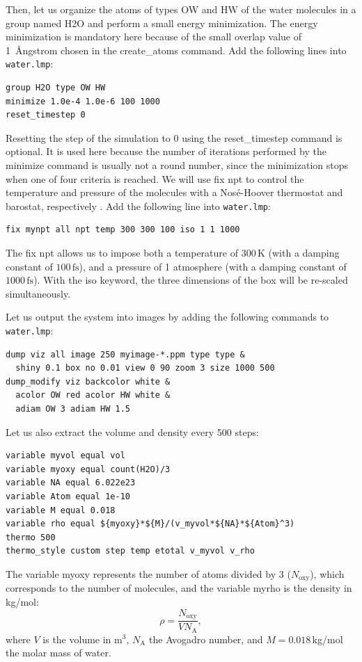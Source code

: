 \documentclass[9pt,tutorial]{livecoms}
\newcommand{\lmpcmd}[1]{\hspace{0pt}\colorbox{listing}{\textcolor{command}{\small{#1}}}\hspace{0pt}} %
\newcommand{\flecmd}[1]{\textcolor{command}{\texttt{#1}}} %
\begin{document}
Then, let us organize the atoms of types OW and HW of the water molecules in a
group named \lmpcmd{H2O} and perform a small energy minimization.  The energy
minimization is mandatory here because of the small \lmpcmd{overlap} value
of 1~Ångstrom chosen in the \lmpcmd{create\_atoms} command.  Add the following lines into \flecmd{water.lmp}:
\begin{lstlisting}
group H2O type OW HW
minimize 1.0e-4 1.0e-6 100 1000
reset_timestep 0
\end{lstlisting}
Resetting the step of the simulation to 0 using the
\lmpcmd{reset\_timestep} command is optional.
It is used here because the number of iterations performed by the \lmpcmd{minimize}
command is usually not a round number, since the minimization stops when one of
four criteria is reached.  We will use \lmpcmd{fix npt} to control the temperature
and pressure of the molecules with a Nosé-Hoover thermostat and barostat,
respectively \cite{nose1984unified, hoover1985canonical, martyna1994constant}.
Add the following line into \flecmd{water.lmp}:
\begin{lstlisting}
fix mynpt all npt temp 300 300 100 iso 1 1 1000
\end{lstlisting}
The \lmpcmd{fix npt} allows us to impose both a temperature of $300\,\text{K}$
(with a damping constant of $100\,\text{fs}$), and a pressure of 1 atmosphere
(with a damping constant of $1000\,\text{fs}$).  With the \lmpcmd{iso} keyword,
the three dimensions of the box will be re-scaled simultaneously.

Let us output the system into images by adding the following commands to \flecmd{water.lmp}:
\begin{lstlisting}
dump viz all image 250 myimage-*.ppm type type &
  shiny 0.1 box no 0.01 view 0 90 zoom 3 size 1000 500
dump_modify viz backcolor white &
  acolor OW red acolor HW white &
  adiam OW 3 adiam HW 1.5
\end{lstlisting}
Let us also extract the volume and density every 500 steps:
\begin{lstlisting}
variable myvol equal vol
variable myoxy equal count(H2O)/3
variable NA equal 6.022e23
variable Atom equal 1e-10
variable M equal 0.018
variable rho equal ${myoxy}*${M}/(v_myvol*${NA}*${Atom}^3)
thermo 500
thermo_style custom step temp etotal v_myvol v_rho
\end{lstlisting}
The variable \lmpcmd{myoxy} represents the number of atoms divided by 3 ($N_\text{oxy}$),
which corresponds to the number of molecules, and the variable \lmpcmd{myrho} is
the density in kg/mol:
\begin{equation}
\rho = \dfrac{N_\text{oxy}}{V N_\text{A}},
\end{equation}
where $V$ is the volume in m$^3$, $N_\text{A}$ the Avogadro number, and
$M = 0.018$\,kg/mol the molar mass of water.
\end{document}

